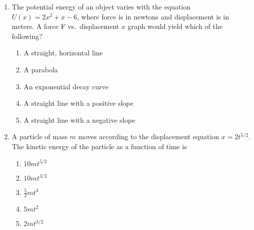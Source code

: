 \documentclass{../../../oss-apphys}
\begin{document}
\begin{multicols}{2}
\begin{enumerate}[leftmargin=18pt,resume]
  \item The potential energy of an object varies with the equation
    $U(x)=2x^2+x-6$, where force is in newtons and displacement is in meters. A
    force F vs.\ displacement $x$ graph would yield which of the following?
    \begin{enumerate}[noitemsep,topsep=0pt,leftmargin=18pt,label=(\Alph*)]
    \item A straight, horizontal line
    \item A parabola
    \item An exponential decay curve
    \item A straight line with a positive slope
    \item A straight line with a negative slope
    \end{enumerate}
    

  \item A particle of mass $m$ moves according to the displacement equation
    $x=2t^{5/2}$. The kinetic energy of the particle as a function of time is
    \begin{enumerate}[noitemsep,topsep=0pt,leftmargin=18pt,label=(\Alph*)]
    \item $10mt^{5/2}$
    \item $10mt^{3/2}$
    \item $\frac{5}{2}mt^3$
    \item $5mt^2$
    \item $2mt^{3/2}$
    \end{enumerate}


\end{enumerate}
\end{multicols}
\end{document}
